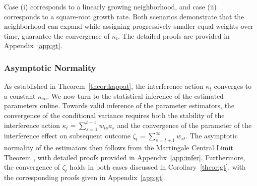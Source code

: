 \documentclass[12pt]{article}
\begin{document}
Case (i) corresponds to a linearly growing neighborhood, and case (ii) corresponds to a square-root growth rate. Both scenarios demonstrate that the neighborhood can expand while assigning progressively smaller equal weights over time, guarantee the convergence of $\kappa_t$. The detailed proofs are provided in Appendix~\ref{app:gt}.


\subsubsection{Asymptotic Normality}
\label{sec:normal}
As established in Theorem~\ref{theor:kappat}, the interference action $\kappa_t$ converges to a constant $\kappa_{\infty}$. We now turn to the statistical inference of the estimated parameters online. 
Towards valid inference of the parameter estimators, the convergence of the conditional variance requires both the stability of the interference action $\kappa_t=\sum_{s=1}^{t-1} w_{ts} a_s$ and the convergence of the parameter of the interference effect on subsequent outcome $\zeta_t = \sum_{s=t+1}^{\infty} w_{st}$. The asymptotic normality of the estimators then follows from the Martingale Central Limit Theorem \citep{hall2014martingale}, with detailed proofs provided in Appendix~\ref{app:infer}. Furthermore, the convergence of $\zeta_t$ holds in both cases discussed in Corollary~\ref{theor:gt}, with the corresponding proofs given in Appendix~\ref{app:gt}.
\end{document}
